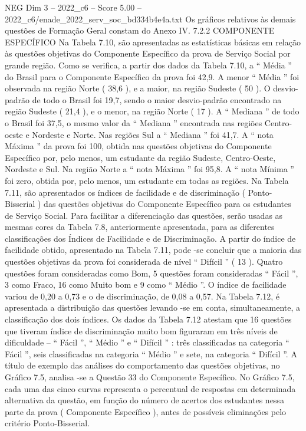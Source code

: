 \begin{textsample}{NEG Dim 3 – 2022\_c6 – Score 5.00 – 2022\_c6/enade\_2022\_serv\_soc\_bd334b4e4a.txt}
Os gráficos relativos às demais questões de Formação Geral constam do Anexo IV. 7.2.2 COMPONENTE ESPECÍFICO Na Tabela 7.10, são apresentadas as estatísticas básicas em relação às questões objetivas do Componente Específico da prova de Serviço Social por grande região.
Como se verifica, a partir dos dados da Tabela 7.10, a “ Média ” do Brasil para o Componente Específico da prova foi 42,9.
A menor “ Média ” foi observada na região Norte ( 38,6 ), e a maior, na região Sudeste ( 50 ).
O desvio-padrão de todo o Brasil foi 19,7, sendo o maior desvio-padrão encontrado na região Sudeste ( 21,4 ), e o menor, na região Norte ( 17 ).
A “ Mediana ” de todo o Brasil foi 37,5, o mesmo valor da “ Mediana ” encontrada nas regiões Centro-oeste e Nordeste e Norte.
Nas regiões Sul a “ Mediana ” foi 41,7.
A “ nota Máxima ” da prova foi 100, obtida nas questões objetivas do Componente Específico por, pelo menos, um estudante da região Sudeste, Centro-Oeste, Nordeste e Sul.
Na região Norte a “ nota Máxima ” foi 95,8.
A “ nota Mínima ” foi zero, obtida por, pelo menos, um estudante em todas as regiões.
Na Tabela 7.11, são apresentados os índices de facilidade e de discriminação ( Ponto-Bisserial ) das questões objetivas do Componente Específico para os estudantes de Serviço Social.
Para facilitar a diferenciação das questões, serão usadas as mesmas cores da Tabela 7.8, anteriormente apresentada, para as diferentes classificações dos Índices de Facilidade e de Discriminação.
A partir do índice de facilidade obtido, apresentado na Tabela 7.11, pode -se concluir que a maioria das questões objetivas da prova foi considerada de nível “ Difícil ” ( 13 ).
Quatro questões foram consideradas como Bom, 5 questões foram consideradas “ Fácil ”, 3 como Fraco, 16 como Muito bom e 9 como “ Médio ”.
O índice de facilidade variou de 0,20 a 0,73 e o de discriminação, de 0,08 a 0,57.
Na Tabela 7.12, é apresentada a distribuição das questões levando -se em conta, simultaneamente, a classificação dos dois índices.
Os dados da Tabela 7.12 atestam que 16 questões que tiveram índice de discriminação muito bom figuraram em três níveis de dificuldade – “ Fácil ”, “ Médio ” e “ Difícil ” : três classificadas na categoria “ Fácil ”, seis classificadas na categoria “ Médio ” e sete, na categoria “ Difícil ”.
A título de exemplo das análises do comportamento das questões objetivas, no Gráfico 7.5, analisa -se a Questão 33 do Componente Específico.
No Gráfico 7.5, cada uma das cinco curvas representa o percentual de respostas em determinada alternativa da questão, em função do número de acertos dos estudantes nessa parte da prova ( Componente Específico ), antes de possíveis eliminações pelo critério Ponto-Bisserial.

\end{textsample}
